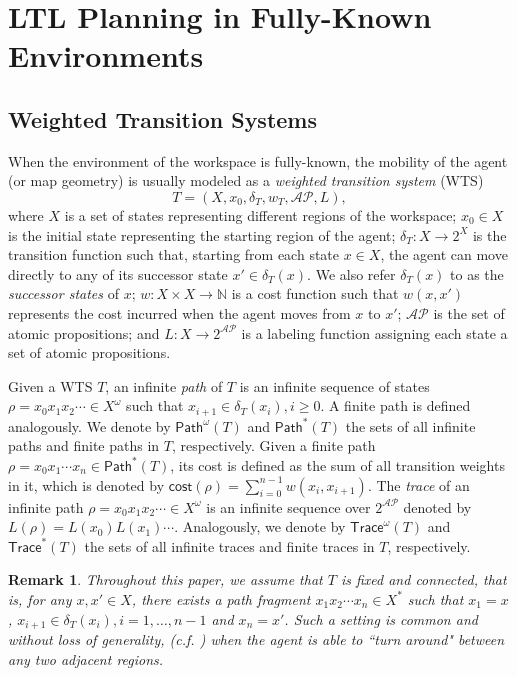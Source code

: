 \documentclass{ifacconf}
\newtheorem{remark}{Remark}
\def \AP{\mathcal{AP}}
\def \NN{\mathbb{N}}
\def \trace{\textsf{Trace}}
\def \path{\textsf{Path}}
\def \cost{\textsf{cost}}
\begin{document}
\section{LTL Planning in Fully-Known Environments}\label{sec:plan-standard} 
%
\subsection{Weighted Transition Systems}
When the environment of the workspace is fully-known, the mobility of the agent (or map geometry) is usually modeled as a \emph{weighted transition system} (WTS)
\[
T=(X,x_0,\delta_T,w_T,\AP,L), 
\]
where 
$X$ is a set of states representing different regions of the workspace;
$x_0\in X$ is the initial state representing the starting region of the agent; $\delta_T:X\to 2^X$ is the transition function  such that, 
starting from each state $x\in X$, the agent can move directly to any of its successor state $x'\in\delta_T(x)$. We also refer $\delta_T(x)$ to as the \emph{successor states} of $x$; 
$w:X\times X\to\NN$ is a cost function such that 
  $w(x,x')$ represents the cost incurred when the agent moves from $x$ to $x'$;
  $\AP$ is the set of atomic propositions; and
   $L:X\to2^\AP$ is a labeling function assigning each state a set of atomic propositions.
 
Given a WTS $T$, an infinite \emph{path} of $T$ is an infinite sequence of states 
$\rho=x_0x_1x_2\cdots \in X^\omega$ 
such that $x_{i+1}\in\delta_T(x_i), i\geq 0$. 
A finite path is defined analogously. 
We denote by $\path^\omega(T)$ and $\path^*(T)$ the sets of all infinite paths and finite paths in $T$, respectively.  
Given a finite path $\rho=x_0x_1\cdots x_n\in\path^*(T)$, its cost is defined as the sum of all transition weights in it, which is denoted by 
$\cost(\rho)=\sum_{i=0}^{n-1}w(x_i,x_{i+1})$. 
The \emph{trace} of  an infinite path $\rho=x_0x_1x_2\cdots \in X^\omega$ is an infinite sequence over $2^\AP$ denoted by $L(\rho)=L(x_0)L(x_1)\cdots$. Analogously, we denote by $\trace^\omega(T)$ and $\trace^*(T)$ the sets of all infinite traces and finite traces in $T$, respectively.

\begin{remark}\label{rmk-connected}
Throughout this paper, we assume that $T$ is fixed and connected, that is, for any $x,x'\!\in\! X$, there exists a path fragment $x_1x_2\cdots x_n\!\in\! X^*$ such that $x_1\!=\!x$, $x_{i+1}\!\in\!\delta_T(x_i),i\!=\!1,\ldots,n\!-\!1$ and $x_n\!=\!x'$. Such a setting is common and without loss of generality, (c.f. \cite{macdonald2019active}) when
the agent is able to ``turn around" between any two adjacent regions.
\end{remark}
 
\end{document}
